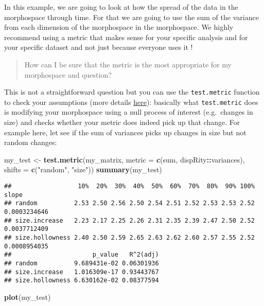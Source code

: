 \documentclass[
]{book}
\newenvironment{Shaded}{\begin{snugshade}}{\end{snugshade}}
\newcommand{\AttributeTok}[1]{\textcolor[rgb]{0.13,0.29,0.53}{#1}}
\newcommand{\FunctionTok}[1]{\textcolor[rgb]{0.13,0.29,0.53}{\textbf{#1}}}
\newcommand{\NormalTok}[1]{#1}
\newcommand{\OtherTok}[1]{\textcolor[rgb]{0.56,0.35,0.01}{#1}}
\newcommand{\SpecialCharTok}[1]{\textcolor[rgb]{0.81,0.36,0.00}{\textbf{#1}}}
\newcommand{\StringTok}[1]{\textcolor[rgb]{0.31,0.60,0.02}{#1}}
\begin{document}
In this example, we are going to look at how the spread of the data in the morphospace through time.
For that we are going to use the sum of the variance from each dimension of the morphospace in the morphospace.
We highly recommend using a metric that makes sense for your specific analysis and for your specific dataset and not just because everyone uses it \citep[\citet{Guillerme2020}]{moms}!

\begin{quote}
How can I be sure that the metric is the most appropriate for my morphospace and question?
\end{quote}

This is not a straightforward question but you can use the \texttt{test.metric} function to check your assumptions (more details \protect\hyperlink{disparity-metrics}{here}): basically what \texttt{test.metric} does is modifying your morphospace using a null process of interest (e.g.~changes in size) and checks whether your metric does indeed pick up that change.
For example here, let see if the sum of variances picks up changes in size but not random changes:

\begin{Shaded}
\begin{Highlighting}[]
\NormalTok{my\_test }\OtherTok{\textless{}{-}} \FunctionTok{test.metric}\NormalTok{(my\_matrix, }\AttributeTok{metric =} \FunctionTok{c}\NormalTok{(sum, dispRity}\SpecialCharTok{::}\NormalTok{variances), }\AttributeTok{shifts =} \FunctionTok{c}\NormalTok{(}\StringTok{"random"}\NormalTok{, }\StringTok{"size"}\NormalTok{))}
\FunctionTok{summary}\NormalTok{(my\_test)}
\end{Highlighting}
\end{Shaded}

\begin{verbatim}
##                  10%  20%  30%  40%  50%  60%  70%  80%  90% 100%        slope
## random          2.53 2.50 2.56 2.50 2.54 2.51 2.52 2.53 2.53 2.52 0.0003234646
## size.increase   2.23 2.17 2.25 2.26 2.31 2.35 2.39 2.47 2.50 2.52 0.0037712409
## size.hollowness 2.40 2.50 2.59 2.65 2.63 2.62 2.60 2.57 2.55 2.52 0.0008954035
##                      p_value   R^2(adj)
## random          9.689431e-02 0.06301936
## size.increase   1.016309e-17 0.93443767
## size.hollowness 6.630162e-02 0.08377594
\end{verbatim}

\begin{Shaded}
\begin{Highlighting}[]
\FunctionTok{plot}\NormalTok{(my\_test)}
\end{Highlighting}
\end{Shaded}
\end{document}
